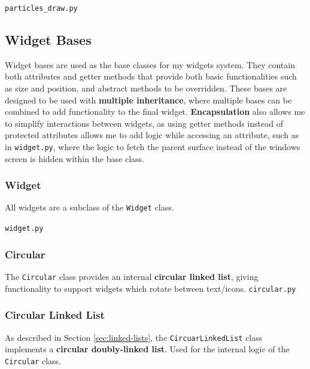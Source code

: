\documentclass[../main/main.tex]{subfiles}
\begin{document}
\noindent\verb|particles_draw.py|


\subsection{Widget Bases}
\label{sec:widget-bases}
Widget bases are used as the base classes for my widgets system. They contain both attributes and getter methods that provide both basic functionalities such as size and position, and abstract methods to be overridden. These bases are designed to be used with \textbf{multiple inheritance}, where multiple bases can be combined to add functionality to the final widget. \textbf{Encapsulation} also allows me to simplify interactions between widgets, as using getter methods instead of protected attributes allows me to add logic while accessing an attribute, such as in \verb|widget.py|, where the logic to fetch the parent surface instead of the windows screen is hidden within the base class.

\subsubsection*{Widget}
\noindent All widgets are a subclass of the \lstinline{Widget} class.

\noindent\verb|widget.py|


\subsubsection*{Circular}
\noindent The \lstinline{Circular} class provides an internal \textbf{circular linked list}, giving functionality to support widgets which rotate between text/icons.
\noindent\verb|circular.py|


\subsubsection*{Circular Linked List}
\label{sec:linked-list}
As described in Section \ref{sec:linked-lists}, the \lstinline{CircuarLinkedList} class implements a \textbf{circular doubly-linked list}. Used for the internal logic of the \lstinline{Circular} class.
\end{document}
